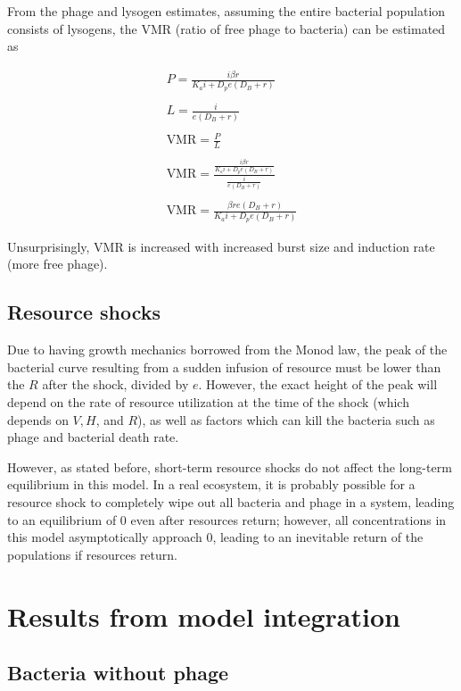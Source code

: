 \documentclass{article}
\begin{document}
From the phage and lysogen estimates, assuming the entire bacterial population consists of lysogens, the VMR (ratio of free phage to bacteria) can be estimated as 
\begin{center}
\begin{align*}
P = \frac{i \beta r }{K_a i + D_p e (D_B+r)} \\ \\
L = \frac{i}{e (D_B + r)} \\ \\
\text{VMR} = \frac{P}{L} \\ \\
\text{VMR} = \frac{\frac{i \beta r }{K_a i + D_p e (D_B+r)}}{\frac{i}{e (D_B + r)}} \\ \\
\text{VMR} = \frac{\beta r e (D_B + r)}{K_a i + D_pe (D_B + r)}
\end{align*}
\end{center}

Unsurprisingly, VMR is increased with increased burst size and induction rate (more free phage).

\subsection{Resource shocks}
Due to having growth mechanics borrowed from the Monod law, the peak of the bacterial curve resulting from a sudden infusion of resource must be lower than the $R$ after the shock, divided by $e$. However, the exact height of the peak will depend on the rate of resource utilization at the time of the shock (which depends on $V, H$, and $R$), as well as factors which can kill the bacteria such as phage and bacterial death rate. 

However, as stated before, short-term resource shocks do not affect the long-term equilibrium in this model. In a real ecosystem, it is probably possible for a resource shock to completely wipe out all bacteria and phage in a system, leading to an equilibrium of 0 even after resources return; however, all concentrations in this model asymptotically approach 0, leading to an inevitable return of the populations if resources return. 

\section{Results from model integration}
\subsection {Bacteria without phage}
\end{document}
